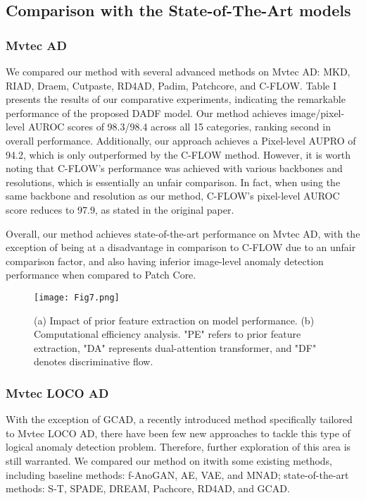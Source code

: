 \documentclass[journal]{IEEEtran}
\begin{document}
\subsection{Comparison with the State-of-The-Art models}
\subsubsection{Mvtec AD} We compared our method with several advanced methods on Mvtec AD: MKD\cite{r11}, RIAD\cite{r20}, Draem\cite{r21}, Cutpaste\cite{r22}, RD4AD\cite{r12}, Padim\cite{r14}, Patchcore\cite{r5}, and C-FLOW\cite{r7}. Table I presents the results of our comparative experiments, indicating the remarkable performance of the proposed DADF model. Our method achieves image/pixel-level AUROC scores of 98.3/98.4 across all 15 categories, ranking second in overall performance. Additionally, our approach achieves a Pixel-level AUPRO of 94.2, which is only outperformed by the C-FLOW method. However, it is worth noting that C-FLOW's performance was achieved with various backbones and resolutions, which is essentially an unfair comparison. In fact, when using the same backbone and resolution as our method, C-FLOW's pixel-level AUROC score reduces to 97.9, as stated in the original paper.

Overall, our method achieves state-of-the-art performance on Mvtec AD, with the exception of being at a disadvantage in comparison to C-FLOW due to an unfair comparison factor, and also having inferior image-level anomaly detection performance when compared to Patch Core.
\begin{figure}[t]
\centerline{\texttt{[image: Fig7.png]}}
\caption[width=8.8cm]{
(a) Impact of prior feature extraction on model performance. (b) Computational efficiency analysis. "PE" refers to prior feature extraction, "DA" represents dual-attention transformer, and "DF" denotes discriminative flow.
}
\label{fig1}
\end{figure}

\subsubsection{Mvtec LOCO AD}

With the exception of GCAD\cite{r23}, a recently introduced method specifically tailored to Mvtec LOCO AD, there have been few new approaches to tackle this type of logical anomaly detection problem. Therefore, further exploration of this area is still warranted. We compared our method on itwith some existing methods, including baseline methods: f-AnoGAN\cite{r26}, AE\cite{r23}, VAE\cite{r27}, and MNAD\cite{r28}; state-of-the-art methods: S-T\cite{r6}, SPADE\cite{r15}, DREAM\cite{r21},  Pachcore\cite{r5}, RD4AD\cite{r12}, and GCAD\cite{r23}.
\end{document}
